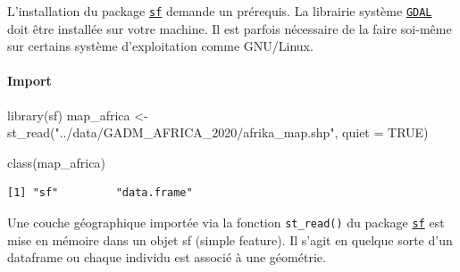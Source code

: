 \documentclass[
  letterpaper,
  DIV=11,
  numbers=noendperiod]{scrartcl}
\let\oldparagraph\paragraph
\renewcommand{\paragraph}[1]{\oldparagraph{#1}\mbox{}}
\newenvironment{Shaded}{\begin{snugshade}}{\end{snugshade}}
\newcommand{\AttributeTok}[1]{\textcolor[rgb]{0.40,0.45,0.13}{#1}}
\newcommand{\ConstantTok}[1]{\textcolor[rgb]{0.56,0.35,0.01}{#1}}
\newcommand{\FunctionTok}[1]{\textcolor[rgb]{0.28,0.35,0.67}{#1}}
\newcommand{\NormalTok}[1]{\textcolor[rgb]{0.00,0.23,0.31}{#1}}
\newcommand{\OtherTok}[1]{\textcolor[rgb]{0.00,0.23,0.31}{#1}}
\newcommand{\StringTok}[1]{\textcolor[rgb]{0.13,0.47,0.30}{#1}}
\begin{document}
\begin{tcolorbox}[enhanced jigsaw, opacityback=0, bottomrule=.15mm, titlerule=0mm, left=2mm, bottomtitle=1mm, title=\textcolor{quarto-callout-note-color}{\faInfo}\hspace{0.5em}{Note}, opacitybacktitle=0.6, breakable, colbacktitle=quarto-callout-note-color!10!white, leftrule=.75mm, colframe=quarto-callout-note-color-frame, rightrule=.15mm, toprule=.15mm, coltitle=black, arc=.35mm, colback=white, toptitle=1mm]

L'installation du package
\href{https://r-spatial.github.io/sf/}{\texttt{sf}} demande un
prérequis. La librairie système \href{https://gdal.org/}{\texttt{GDAL}}
doit être installée sur votre machine. Il est parfois nécessaire de la
faire soi-même sur certains système d'exploitation comme GNU/Linux.

\end{tcolorbox}

\hypertarget{import-2}{%
\paragraph{Import}\label{import-2}}

\begin{Shaded}
\begin{Highlighting}[]
\FunctionTok{library}\NormalTok{(sf)}
\NormalTok{map\_africa }\OtherTok{\textless{}{-}} \FunctionTok{st\_read}\NormalTok{(}\StringTok{"../data/GADM\_AFRICA\_2020/afrika\_map.shp"}\NormalTok{,  }\AttributeTok{quiet =} \ConstantTok{TRUE}\NormalTok{)}

\FunctionTok{class}\NormalTok{(map\_africa)}
\end{Highlighting}
\end{Shaded}

\begin{verbatim}
[1] "sf"         "data.frame"
\end{verbatim}

\begin{tcolorbox}[enhanced jigsaw, opacityback=0, bottomrule=.15mm, titlerule=0mm, left=2mm, bottomtitle=1mm, title=\textcolor{quarto-callout-important-color}{\faExclamation}\hspace{0.5em}{Important}, opacitybacktitle=0.6, breakable, colbacktitle=quarto-callout-important-color!10!white, leftrule=.75mm, colframe=quarto-callout-important-color-frame, rightrule=.15mm, toprule=.15mm, coltitle=black, arc=.35mm, colback=white, toptitle=1mm]

Une couche géographique importée via la fonction \texttt{st\_read()} du
package \href{https://r-spatial.github.io/sf/}{\texttt{sf}} est mise en
mémoire dans un objet sf (simple feature). Il s'agit en quelque sorte
d'un dataframe ou chaque individu est associé à une géométrie.

\end{tcolorbox}
\end{document}
